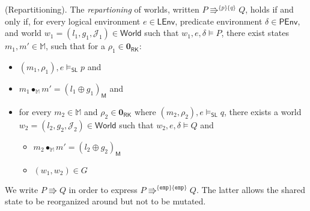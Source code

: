 \begin{defn}
	(Repartitioning).
	\label{repartitioning}
	The \emph{repartioning} of worlds, written $P \Rrightarrow^{\{p\}\{q\}} Q$, holds if and only if, for every logical environment $e \in \mathsf{LEnv}$, predicate environment $\delta \in \mathsf{PEnv}$, and world $w_1 = (l_1, g_1, \mathcal{J}_1) \in \mathsf{World}$ such that $w_1, e, \delta \vDash P$, there exist states $m_1, m' \in \mathbb{M}$, such that for a $\rho_1 \in \mathbf{0}_\mathsf{RK}$:
	\begin{itemize}
		\item $(m_1, \rho_1), e \vDash_\mathsf{SL} p$ and
		\item $m_1 \bullet_\mathbb{M} m' = (l_1 \oplus g_1)_\mathsf{M}$ and
		\item for every $m_2 \in \mathbb{M}$ and $\rho_2 \in  \mathbf{0}_\mathsf{RK}$ where $(m_2, \rho_2), e \vDash_\mathsf{SL} q$, there exists a world $w_2 = (l_2, g_2, \mathcal{J}_2) \in \mathsf{World}$ such that $w_2, e, \delta \vDash Q$ and
			\begin{itemize}
				\item $m_2 \bullet_\mathbb{M} m' = (l_2 \oplus g_2)_\mathsf{M}$
				\item $(w_1, w_2) \in G$
			\end{itemize}
	\end{itemize}
\end{defn}

We write $P \Rrightarrow Q$ in order to express $P \Rrightarrow^{\{\mathtt{emp}\}\{\mathtt{emp}\}}Q$. The latter allows the shared state to be reorganized around but not to be mutated.
